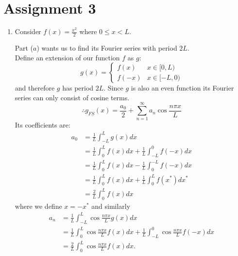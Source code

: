 \pagestyle{fancy}
\fancyhead{}

\section{Assignment 3}
\begin{enumerate}
    \item Consider $f(x)=\frac{x^2}{2}$ where $0\leq x<L$.

    Part ($a$) wants us to find its Fourier series with period $2L$. \\

    Define an extension of our function $f$ as $g$:
    $$g(x) =
    \left\{
    \begin{array}{ll}
	   f(x)  & \mbox{} x\in[0,L) \\
	   f(-x) & \mbox{} x\in[-L,0)
    \end{array}
    \right.$$
    and therefore $g$ has period $2L$. Since $g$ is also an even function its Fourier series can only consist of cosine terms.
    $$\therefore g_{FS}(x)=\frac{a_0}{2}+\sum_{n=1}^{\infty}a_n\cos\frac{n\pi x}{L}$$
    Its coefficients are:
    \begin{align*}
        a_0
        &=\frac{1}{L}\int_{-L}^{L}g(x)dx \\
        &=\frac{1}{L}\int_{0}^{L}f(x)dx+\frac{1}{L}\int_{-L}^{0}f(-x)dx \\
        &=\frac{1}{L}\int_{0}^{L}f(x)dx-\frac{1}{L}\int_{0}^{-L}f(-x)dx \\
        &=\frac{1}{L}\int_{0}^{L}f(x)dx+\frac{1}{L}\int_{0}^{L}f(x^*)dx^* \\
        &=\frac{2}{L}\int_{0}^{L}f(x)dx
    \end{align*}
    where we define $x=-x^*$ and similarly
    \begin{align*}
        a_n
        &=\frac{1}{L}\int_{-L}^{L}\cos\frac{n\pi x}{L}g(x)dx \\
        &=\frac{1}{L}\int_{0}^{L}\cos\frac{n\pi x}{L}f(x)dx+\frac{1}{L}\int_{-L}^{0}\cos\frac{n\pi x}{L}f(-x)dx \\
        &=\frac{2}{L}\int_{0}^{L}\cos\frac{n\pi x}{L}f(x)dx.
    \end{align*}

    \newpage


\end{enumerate}
